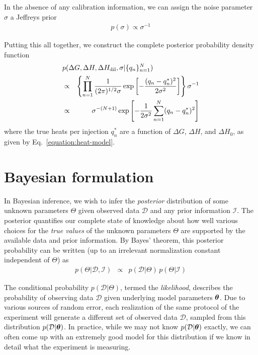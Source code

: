 \documentclass[aps,pre,twocolumn,nofootinbib,superscriptaddress,linenumbers]{revtex4-1}
\newcommand{\bfv}[1]{{\mbox{\boldmath{$#1$}}}}
\begin{document}
In the absence of any calibration information, we can assign the noise parameter $\sigma$ a Jeffreys prior
\begin{eqnarray}
p(\sigma) \propto \sigma^{-1}
\end{eqnarray}

Putting this all together, we construct the complete posterior probability density function
\begin{eqnarray}
\lefteqn{p(\Delta G, \Delta H, \Delta H_\mathrm{dil}, \sigma | \{q_n\}_{n=1}^N)} \nonumber \\
&\propto& \left\{ \prod_{n=1}^N \frac{1}{(2 \pi)^{1/2} \sigma} \exp\left[- \frac{(q_n - q_n^*)^2}{2 \sigma^2}\right] \right\} \sigma^{-1} \nonumber \\
&\propto& \sigma^{-(N+1)} \exp\left[- \frac{1}{2 \sigma^2} \sum_{n=1}^N (q_n - q_n^*)^2\right] \label{equation:posterior}
\end{eqnarray}
where the true heats per injection $q_n^*$ are a function of $\Delta G$, $\Delta H$, and $\Delta H_0$, as given by Eq.~\ref{equation:heat-model}.
\color{black}

\section{Bayesian formulation}
\label{section:bayesian-formulation}

In Bayesian inference, we wish to infer the \emph{posterior} distribution of some unknown parameters $\Theta$ given observed data $\mathcal{D}$ and any prior information $\mathcal{I}$.
The posterior quantifies our complete state of knowledge about how well various choices for the \emph{true values} of the unknown parameters $\Theta$ are supported by the available data and prior information.
By Bayes' theorem, this posterior probability can be written (up to an irrelevant normalization constant independent of $\Theta$) as
\begin{eqnarray}
p(\Theta | \mathcal{D}, \mathcal{I}) &\propto& p(\mathcal{D} | \Theta) \, p(\Theta | \mathcal{I})
\end{eqnarray}

The conditional probability $p(\mathcal{D} | \Theta)$, termed the \emph{likelihood}, describes the probability of observing data $\mathcal{D}$ given underlying model parameters $\bfv{\theta}$.
Due to various sources of random error, each realization of the same protocol of the experiment will generate a different set of observed data $\mathcal{D}$, sampled from this distribution $p(\mathcal{D} | \bfv{\theta})$.
In practice, while we may not know $p(\mathcal{D} | \bfv{\theta})$ exactly, we can often come up with an extremely good model for this distribution if we know in detail what the experiment is measuring.
\end{document}
